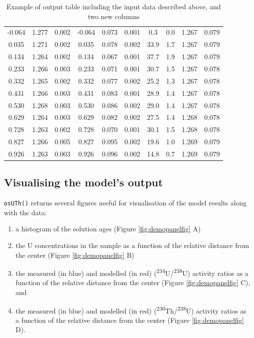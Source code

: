 \documentclass[]{elsarticle} %
\providecommand{\tightlist}{%
  \setlength{\itemsep}{0pt}\setlength{\parskip}{0pt}}
\begin{document}
\begin{table}[ht]
\begin{tabular}{cccccccccc}
  -0.064 & 1.277 & 0.002 & -0.064 & 0.073 & 0.001 & 0.3 & 0.0 & 1.267 & 0.079 \\ 
  0.035 & 1.271 & 0.002 & 0.035 & 0.078 & 0.002 & 33.9 & 1.7 & 1.267 & 0.079 \\ 
  0.134 & 1.264 & 0.002 & 0.134 & 0.067 & 0.001 & 37.7 & 1.9 & 1.267 & 0.079 \\ 
  0.233 & 1.266 & 0.003 & 0.233 & 0.071 & 0.001 & 30.7 & 1.5 & 1.267 & 0.078 \\ 
  0.332 & 1.265 & 0.002 & 0.332 & 0.077 & 0.002 & 25.2 & 1.3 & 1.267 & 0.078 \\ 
  0.431 & 1.266 & 0.003 & 0.431 & 0.083 & 0.001 & 28.9 & 1.4 & 1.267 & 0.078 \\ 
  0.530 & 1.268 & 0.003 & 0.530 & 0.086 & 0.002 & 29.0 & 1.4 & 1.267 & 0.078 \\ 
  0.629 & 1.264 & 0.003 & 0.629 & 0.082 & 0.002 & 27.5 & 1.4 & 1.268 & 0.078 \\ 
  0.728 & 1.263 & 0.002 & 0.728 & 0.070 & 0.001 & 30.1 & 1.5 & 1.268 & 0.078 \\ 
  0.827 & 1.266 & 0.005 & 0.827 & 0.095 & 0.002 & 19.6 & 1.0 & 1.269 & 0.079 \\ 
  0.926 & 1.263 & 0.003 & 0.926 & 0.096 & 0.002 & 14.8 & 0.7 & 1.269 & 0.079 \\ 
   \hline
\end{tabular}
\caption{\label{tab:outputdata}Example of output table including the input data described above, and two new columns} 
\end{table}

\newpage

\hypertarget{visualising-the-models-output}{%
\subsection{Visualising the model's output}\label{visualising-the-models-output}}

\texttt{osUTh()} returns several figures useful for visualisation of the model results along with the data:

\begin{enumerate}
\def\labelenumi{\arabic{enumi}.}
\tightlist
\item
  a histogram of the solution ages (Figure \ref{fig:demopanelfig} A)
\item
  the U concentrations in the sample as a function of the relative distance from the center (Figure \ref{fig:demopanelfig} B)
\item
  the measured (in blue) and modelled (in red) (\textsuperscript{234}U/\textsuperscript{238}U) activity ratios as a function of the relative distance from the center (Figure \ref{fig:demopanelfig} C), and
\item
  the measured (in blue) and modelled (in red) (\textsuperscript{230}Th/\textsuperscript{238}U) activity ratios as a function of the relative distance from the center (Figure \ref{fig:demopanelfig} D).
\end{enumerate}
\end{document}
